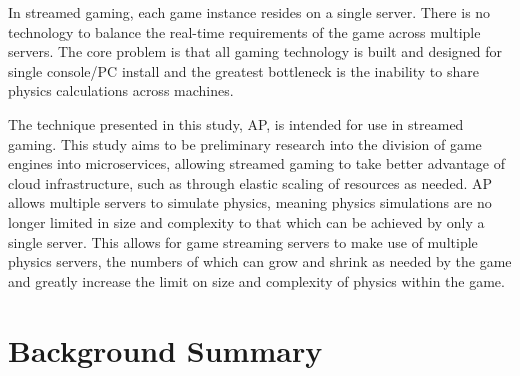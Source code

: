 In streamed gaming, each game instance resides on a single server. There is no technology to balance the real-time requirements of the game across multiple servers. The core problem is that all gaming technology is built and designed for single console/PC install and the greatest bottleneck is the inability to share physics calculations across machines. 

The technique presented in this study, AP, is intended for use in streamed gaming. This study aims to be preliminary research into the division of game engines into microservices, allowing streamed gaming to take better advantage of cloud infrastructure, such as through elastic scaling of resources as needed. 
%
AP allows multiple servers to simulate physics, meaning physics simulations are no longer limited in size and complexity to that which can be achieved by only a single server. This allows for game streaming servers to make use of multiple physics servers, the numbers of which can grow and shrink as needed by the game and greatly increase the limit on size and complexity of physics within the game.

\section{Background Summary}
%

